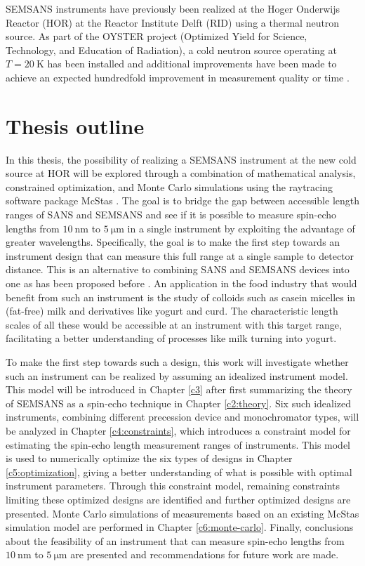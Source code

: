 SEMSANS instruments have previously been realized at the Hoger Onderwijs Reactor (HOR) at the Reactor Institute Delft (RID) using a thermal neutron source. As part of the OYSTER project (Optimized Yield for Science, Technology, and Education of Radiation), a cold neutron source operating at $T=\SI{20}{\kelvin}$ has been installed and additional improvements have been made to achieve an expected hundredfold improvement in measurement quality or time \cite{OYSTER2008}.

\section{Thesis outline}
\label{c1.3}
In this thesis, the possibility of realizing a SEMSANS instrument at the new cold source at HOR will be explored through a combination of mathematical analysis, constrained optimization, and Monte Carlo simulations using the raytracing software package McStas \cite{willendrup2020}. The goal is to bridge the gap between accessible length ranges of SANS and SEMSANS \cite{bouwman2021} and see if it is possible to measure spin-echo lengths from $\SI{10}{\nano\meter}$ to $\SI{5}{\micro\meter}$ in a single instrument by exploiting the advantage of greater wavelengths. Specifically, the goal is to make the first step towards an instrument design that can measure this full range at a single sample to detector distance. This is an alternative to combining SANS and SEMSANS devices into one as has been proposed before \cite{bouwman2011}\cite{kusmin2017}. An application in the food industry that would benefit from such an instrument is the study of colloids such as casein micelles in (fat-free) milk and derivatives like yogurt and curd. The characteristic length scales of all these would be accessible at an instrument with this target range, facilitating a better understanding of processes like milk turning into yogurt. 

To make the first step towards such a design, this work will investigate whether such an instrument can be realized by assuming an idealized instrument model. This model will be introduced in Chapter \ref{c3} after first summarizing the theory of SEMSANS as a spin-echo technique in Chapter \ref{c2:theory}. Six such idealized instruments, combining different precession device and monochromator types, will be analyzed in Chapter \ref{c4:constraints}, which introduces a constraint model for estimating the spin-echo length measurement ranges of instruments. This model is used to numerically optimize the six types of designs in Chapter \ref{c5:optimization}, giving a better understanding of what is possible with optimal instrument parameters. Through this constraint model, remaining constraints limiting these optimized designs are identified and further optimized designs are presented. Monte Carlo simulations of measurements based on an existing McStas simulation model \cite{bouwman2021b} are performed in Chapter \ref{c6:monte-carlo}. Finally, conclusions about the feasibility of an instrument that can measure spin-echo lengths from $\SI{10}{\nano\meter}$ to $\SI{5}{\micro\meter}$ are presented and recommendations for future work are made.